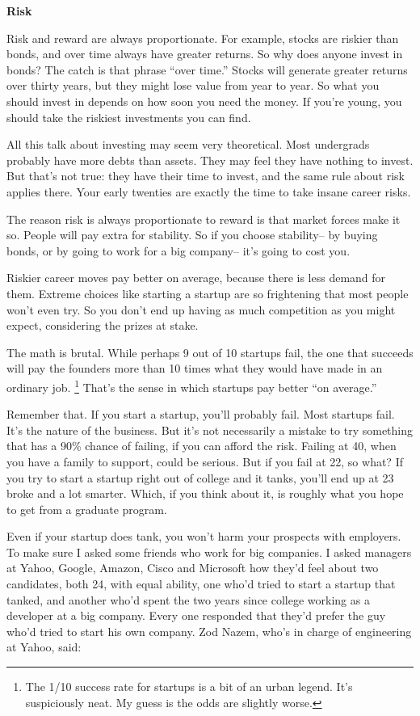 \documentclass[12pt]{book}
\begin{document}
\textbf{Risk}

Risk and reward are always proportionate. For example, stocks are
riskier than bonds, and over time always have greater returns. So why
does anyone invest in bonds? The catch is that phrase ``over time.''
Stocks will generate greater returns over thirty years, but they might
lose value from year to year. So what you should invest in depends on
how soon you need the money. If you're young, you should take the
riskiest investments you can find.

All this talk about investing may seem very theoretical. Most undergrads
probably have more debts than assets. They may feel they have nothing to
invest. But that's not true: they have their time to invest, and the
same rule about risk applies there. Your early twenties are exactly the
time to take insane career risks.

The reason risk is always proportionate to reward is that market forces
make it so. People will pay extra for stability. So if you choose
stability-- by buying bonds, or by going to work for a big company--
it's going to cost you.

Riskier career moves pay better on average, because there is less demand
for them. Extreme choices like starting a startup are so frightening
that most people won't even try. So you don't end up having as much
competition as you might expect, considering the prizes at stake.

The math is brutal. While perhaps 9 out of 10 startups fail, the one
that succeeds will pay the founders more than 10 times what they would
have made in an ordinary job. \footnote{The 1/10 success rate for startups is a bit of an urban legend.
It's suspiciously neat. My guess is the odds are slightly worse.} That's the sense
in which startups pay better ``on average.''

Remember that. If you start a startup, you'll probably fail. Most
startups fail. It's the nature of the business. But it's not necessarily
a mistake to try something that has a 90\% chance of failing, if you can
afford the risk. Failing at 40, when you have a family to support, could
be serious. But if you fail at 22, so what? If you try to start a
startup right out of college and it tanks, you'll end up at 23 broke and
a lot smarter. Which, if you think about it, is roughly what you hope to
get from a graduate program.

Even if your startup does tank, you won't harm your prospects with
employers. To make sure I asked some friends who work for big companies.
I asked managers at Yahoo, Google, Amazon, Cisco and Microsoft how
they'd feel about two candidates, both 24, with equal ability, one who'd
tried to start a startup that tanked, and another who'd spent the two
years since college working as a developer at a big company. Every one
responded that they'd prefer the guy who'd tried to start his own
company. Zod Nazem, who's in charge of engineering at Yahoo, said:
\end{document}
